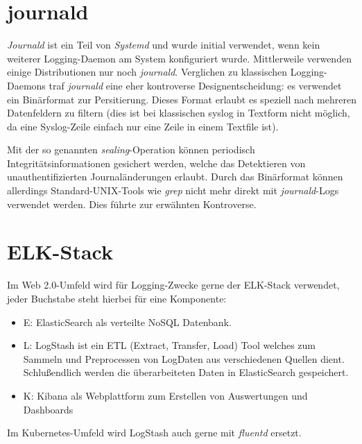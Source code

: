 \section{journald}

\textit{Journald} ist ein Teil von \textit{Systemd} und wurde initial verwendet, wenn kein weiterer Logging-Daemon am System konfiguriert wurde. Mittlerweile verwenden einige Distributionen nur noch \textit{journald}. Verglichen zu klassischen Logging-Daemons traf \textit{journald} eine eher kontroverse Designentscheidung: es verwendet ein Binärformat zur Persitierung. Dieses Format erlaubt es speziell nach mehreren Datenfeldern zu filtern (dies ist bei klassischen syslog in Textform nicht möglich, da eine Syslog-Zeile einfach nur eine Zeile in einem Textfile ist).

Mit der so genannten \textit{sealing}-Operation können periodisch Integritätsinformationen gesichert werden, welche das Detektieren von unauthentifizierten Journaländerungen erlaubt. Durch das Binärformat können allerdings Standard-UNIX-Tools wie \textit{grep} nicht mehr direkt mit \textit{journald}-Logs verwendet werden. Dies führte zur erwähnten Kontroverse.

\section{ELK-Stack}

Im Web 2.0-Umfeld wird für Logging-Zwecke gerne der ELK-Stack verwendet, jeder Buchstabe steht hierbei für eine Komponente:

\begin{itemize}
	\item E: ElasticSearch als verteilte NoSQL Datenbank.
	\item L: LogStash ist ein ETL (Extract, Transfer, Load) Tool welches zum Sammeln und Preprocessen von LogDaten aus verschiedenen Quellen dient. Schlußendlich werden die überarbeiteten Daten in ElasticSearch gespeichert.
	\item K: Kibana als Webplattform zum Erstellen von Auswertungen und Dashboards
\end{itemize}

Im Kubernetes-Umfeld wird LogStash auch gerne mit \textit{fluentd} ersetzt.
